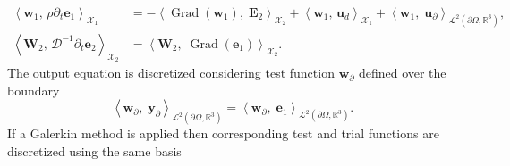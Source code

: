 \documentclass{svjour3}                     %
\DeclareMathOperator*{\Grad}{Grad}
\newcommand{\inner}[3][]{\ensuremath{\left\langle #2, \, #3 \right\rangle_{#1}}}
\newcommand{\firstRev}[1]{\textcolor{red!80!black}{#1}}
\begin{document}
	\firstRev{
		\begin{equation}
		\begin{aligned}
		\inner[\mathscr{X}_1]{\bm{w}_1}{\rho \partial_t \bm{e}_1} &=- \left\langle {\Grad} (\bm{w}_1), \; \bm{E}_2 \right\rangle_{\mathscr{X}_2} + \inner[\mathscr{X}_1]{\bm{w}_1}{\bm{u}_d}  + \left\langle \bm{w}_1, \; \bm{u}_\partial \right\rangle_{\mathscr{L}^2(\partial \Omega, \mathbb{R}^3)}, \\
		\inner[\mathscr{X}_2]{\bm{W}_2}{\bm{\mathcal{D}}^{-1}\partial_t \bm{e}_2} &=\left\langle \bm{W}_2, \; {\Grad} (\bm{e}_1) \right\rangle_{\mathscr{X}_2}.
		\end{aligned}
		\end{equation}
	}
	The output equation is discretized considering test function $\bm{w}_\partial$ defined over the boundary
	\begin{equation}
	\left\langle \bm{w}_\partial, \; \bm{y}_\partial \right\rangle_{\mathscr{L}^2(\partial \Omega, \mathbb{R}^3)} = \left\langle \bm{w}_\partial, \; \bm{e}_1 \right\rangle_{\mathscr{L}^2(\partial \Omega, \mathbb{R}^3)}.
	\end{equation}
	If a Galerkin method is applied then corresponding test and trial functions are discretized using the same basis
\end{document}
